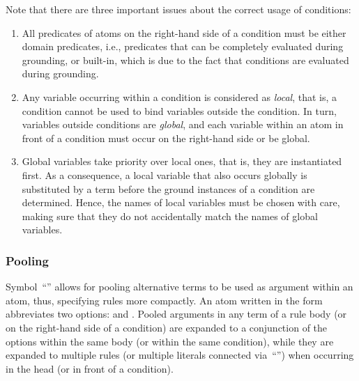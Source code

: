 Note that there are three important issues about the correct usage of conditions:
\begin{enumerate}
\item All predicates of atoms on the right-hand side of a condition
must be either domain predicates,
i.e., predicates that can be completely evaluated during grounding,
or built-in, which is due to the fact that conditions are evaluated during grounding.
\item Any variable occurring within a condition is considered as \emph{local},
that is, a condition cannot be used to bind variables outside the condition.
In turn, variables outside conditions are \emph{global}, and each variable
within an atom in front of a condition must occur on the right-hand side or
be global.
\item Global variables take priority over local ones, that is,
they are instantiated first.
As a consequence, a local variable that also occurs globally is substituted by a term
before the ground instances of a condition are determined.
Hence, the names of local variables must be chosen with care,
making sure that they do not accidentally match the names of global variables.
\end{enumerate}

\subsubsection{Pooling}\label{subsec:gringo:pool}

Symbol~``\code{;}'' allows for pooling alternative terms to be used as
argument within an atom, thus, specifying rules more compactly.
An atom written in the form 
abbreviates two options:
 and .
Pooled arguments in any term of a rule body 
(or on the right-hand side of a condition) are expanded to a conjunction
of the options within the same body (or within the same condition),
while they are expanded to multiple rules 
(or multiple literals connected via~``\code{,}'')
when occurring in the head (or in front of a condition).

